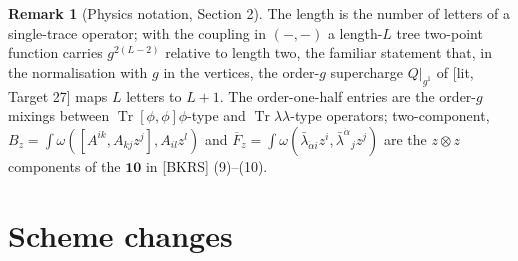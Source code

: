 \documentclass[11pt]{report}
\theoremstyle{plain}
\theoremstyle{definition}
\newtheorem{remark}[theorem]{Remark}
\numberwithin{equation}{chapter}
\begin{document}
\begin{remark}[Physics notation, Section 2]
The length is the number of letters of a single-trace operator; with the coupling in $(-,-)$ a length-$L$ tree two-point function carries $g^{2(L-2)}$ relative to length two, the familiar statement that, in the normalisation with $g$ in the vertices, the order-$g$ supercharge $Q|_{g^1}$ of [lit, Target 27] maps $L$ letters to $L+1$. The order-one-half entries are the order-$g$ mixings between $\operatorname{Tr}[\phi,\phi]\phi$-type and $\operatorname{Tr}\lambda\lambda$-type operators; two-component, $B_z=\int\omega([A^{ik},A_{kj}z^j],A_{il}z^l)$ and $\overline F_z=\int\omega(\bar\lambda_{\dot\alpha i}z^i,\bar\lambda^{\dot\alpha}{}_jz^j)$ are the $z\otimes z$ components of the $\mathbf{10}$ in [BKRS] (9)--(10).
\end{remark}

\section{Scheme changes}
\end{document}
